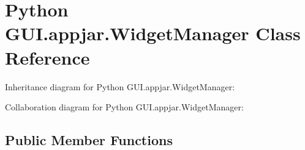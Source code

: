 \hypertarget{class_python_01_g_u_i_1_1appjar_1_1_widget_manager}{}\section{Python G\+U\+I.\+appjar.\+Widget\+Manager Class Reference}
\label{class_python_01_g_u_i_1_1appjar_1_1_widget_manager}


Inheritance diagram for Python G\+U\+I.\+appjar.\+Widget\+Manager\+:


Collaboration diagram for Python G\+U\+I.\+appjar.\+Widget\+Manager\+:
\subsection*{Public Member Functions}
